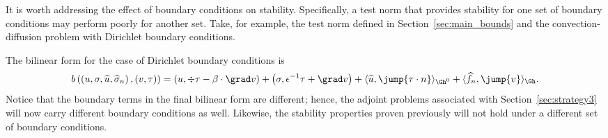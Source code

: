 It is worth addressing the effect of boundary conditions on stability.  Specifically, a test norm that provides stability for one set of boundary conditions may perform poorly for another set.  Take, for example, the test norm defined in Section~\ref{sec:main_bounds} and the convection-diffusion problem with Dirichlet boundary conditions. 

The bilinear form for the case of Dirichlet boundary conditions is 
\[
b\left(\left(u,\sigma, \widehat{u}, \widehat{\sigma}_n\right), \left(v,\tau\right)\right) = \left(u,\div \tau - \beta \cdot \grad v\right) + \left(\sigma, \epsilon^{-1} \tau + \grad v\right) + \langle \widehat{u}, \jump{\tau \cdot n} \rangle_{\Gh^0} + \langle \widehat{f}_n, \jump{v} \rangle_{\Gh}.
\]
Notice that the boundary terms in the final bilinear form are different; hence, the adjoint problems associated with Section~\ref{sec:strategy3} will now carry different boundary conditions as well. Likewise, the stability properties proven previously will not hold under a different set of boundary conditions.  

